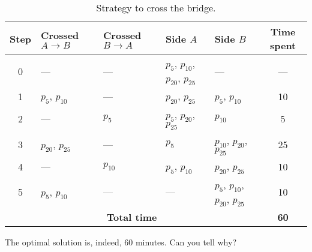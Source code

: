 \begin{enumerate}
{\begin{table}[!htb]
	\centering
	\begin{tabular}{|c|>{\centering}m{2.6cm}|>{\centering}m{2.6cm}|>{\centering}m{1.6cm}|>{\centering}m{1.6cm}|c|}
	\hline
	\textbf{Step} &  \textbf{Crossed $A \rightarrow B$} & \textbf{Crossed $B \rightarrow A$} & \textbf{Side $A$} & \textbf{Side $B$} & \textbf{Time spent} \\ \hline \hline
	0 & --- & --- & $p_{5}$, $p_{10}$, $p_{20}$, $p_{25}$ & --- &  --- \\ \hline
	1 & $p_{5}$, $p_{10}$ & --- &  $p_{20}$, $p_{25}$ & $p_{5}$, $p_{10}$ & 10 \\ \hline
	2 & --- & $p_{5}$ & $p_{5}$, $p_{20}$, $p_{25}$ & $p_{10}$ & 5 \\ \hline
	3 & $p_{20}$, $p_{25}$  & --- & $p_{5}$ & $p_{10}$, $p_{20}$,$p_{25}$ & 25 \\ \hline
	4 & --- & $p_{10}$ & $p_{5}$, $p_{10}$ & $p_{20}$, $p_{25}$ & 10 \\ \hline
	5 & $p_{5}$, $p_{10}$ & --- & --- & $p_{5}$, $p_{10}$, $p_{20}$, $p_{25}$ & 10 \\ \hline \hline
	\multicolumn{5}{|c|}{\textbf{Total time}} & \textbf{60} \\ \hline
	\end{tabular}		
	\caption{Strategy to cross the bridge.}
	\label{tab:ponte}
	\end{table}
The optimal solution is, indeed, $60$ minutes. Can you tell why?

%

}



\end{enumerate}
